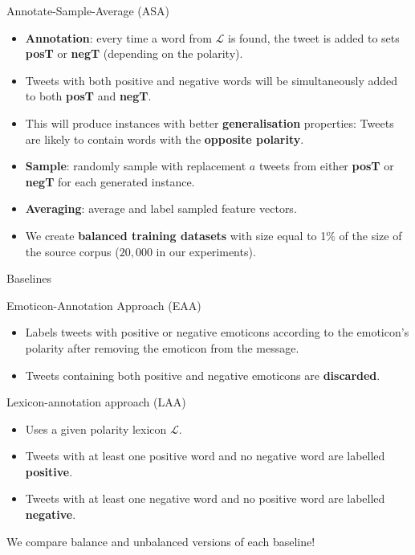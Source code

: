 \documentclass[handout]{beamer}
\begin{document}
\begin{frame}{Annotate-Sample-Average (ASA)}
\begin{scriptsize}
 \begin{itemize}
 \item \textbf{Annotation}: every time a word from $\mathcal{L}$  is found, the  tweet is added to sets \textbf{posT} or \textbf{negT} (depending on the polarity).
 \item Tweets with both positive and negative words will be simultaneously added to both \textbf{posT} and \textbf{negT}. 
 
 \item This will produce instances with better \textbf{generalisation} properties: Tweets are likely to contain words with the \textbf{opposite polarity}.
 \item \textbf{Sample}: randomly sample with replacement $a$ tweets from either \textbf{posT} or \textbf{negT} for each generated instance. 
 \item \textbf{Averaging}: average and label sampled feature vectors.
 \item We create \textbf{balanced training datasets} with size equal to 1\% of the size of the source corpus ($20,000$ in our experiments).
 \end{itemize}
  
\end{scriptsize} 
\end{frame}



\begin{frame}{Baselines}
\begin{scriptsize}
\begin{block}{Emoticon-Annotation Approach (EAA)}
\begin{itemize}
\item Labels tweets with positive or negative emoticons according to the emoticon's polarity after removing the emoticon from the message.
\item  Tweets containing both positive and negative emoticons are \textbf{discarded}.
\end{itemize}
\end{block}

\begin{block}{Lexicon-annotation approach (LAA)}
\begin{itemize}
\item Uses a given polarity lexicon $\mathcal{L}$.
\item Tweets with at least one positive word and no negative word are labelled \textbf{positive}.
\item Tweets with at least one negative word and no positive word are labelled \textbf{negative}.
\end{itemize}
\end{block}

We compare balance and unbalanced versions of each baseline!

\end{scriptsize}
\end{frame}
\end{document}
